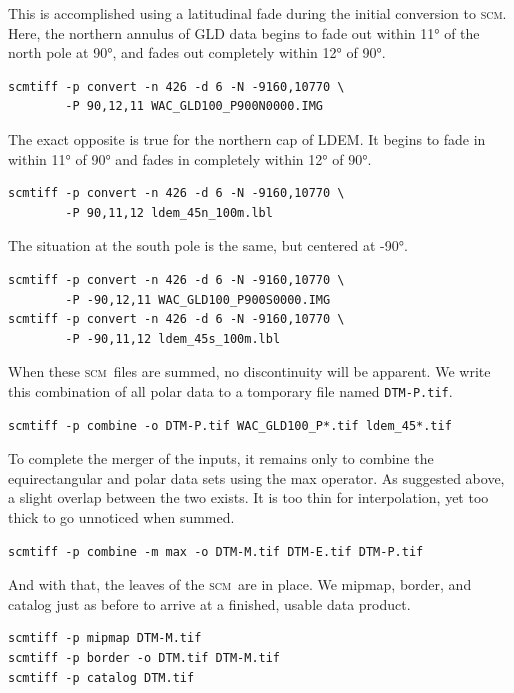 \documentclass[oneside,10pt]{memoir}
\newcommand{\scm}     {\textsc{scm}}
\begin{document}
\begin{Spacing}{1.1}
This is accomplished using a latitudinal fade during the initial conversion to \scm. Here, the northern annulus of GLD data begins to fade out within \ang{11} of the north pole at \ang{90}, and fades out completely within \ang{12} of \ang{90}.

\begin{Verbatim}
scmtiff -p convert -n 426 -d 6 -N -9160,10770 \
        -P 90,12,11 WAC_GLD100_P900N0000.IMG
\end{Verbatim}

The exact opposite is true for the northern cap of LDEM. It begins to fade in within \ang{11} of \ang{90} and fades in completely within \ang{12} of \ang{90}.

\begin{Verbatim}
scmtiff -p convert -n 426 -d 6 -N -9160,10770 \
        -P 90,11,12 ldem_45n_100m.lbl
\end{Verbatim}

The situation at the south pole is the same, but centered at \ang{-90}.

\begin{Verbatim}
scmtiff -p convert -n 426 -d 6 -N -9160,10770 \
        -P -90,12,11 WAC_GLD100_P900S0000.IMG
scmtiff -p convert -n 426 -d 6 -N -9160,10770 \
        -P -90,11,12 ldem_45s_100m.lbl
\end{Verbatim}

When these \scm\ files are summed, no discontinuity will be apparent. We write this combination of all polar data to a tomporary file named \texttt{DTM-P.tif}.

\begin{Verbatim}
scmtiff -p combine -o DTM-P.tif WAC_GLD100_P*.tif ldem_45*.tif
\end{Verbatim}

To complete the merger of the inputs, it remains only to combine the equirectangular and polar data sets using the max operator. As suggested above, a slight overlap between the two exists. It is too thin for interpolation, yet too thick to go unnoticed when summed.

\begin{Verbatim}
scmtiff -p combine -m max -o DTM-M.tif DTM-E.tif DTM-P.tif
\end{Verbatim}

And with that, the leaves of the \scm\ are in place. We mipmap, border, and catalog just as before to arrive at a finished, usable data product.

\begin{Verbatim}
scmtiff -p mipmap DTM-M.tif
scmtiff -p border -o DTM.tif DTM-M.tif
scmtiff -p catalog DTM.tif
\end{Verbatim}


\end{Spacing}
\end{document}
